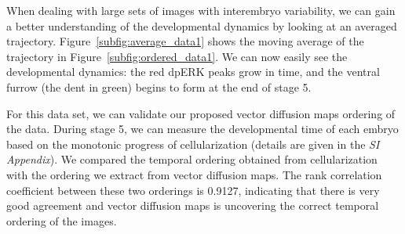 \documentclass{pnastwo}
\begin{document}
\begin{article}
When dealing with large sets of images with interembryo variability, we can gain a better understanding of the developmental dynamics by looking at an averaged trajectory.
%
Figure~\ref{subfig:average_data1} shows the moving average of the trajectory in Figure~\ref{subfig:ordered_data1}. 
%
We can now easily see the developmental dynamics: the red dpERK peaks grow in time, and the ventral furrow (the dent in green) begins to form at the end of stage 5. 

For this data set, we can validate our proposed vector diffusion maps ordering of the data.
%
During stage 5, we can measure the developmental time of each embryo based on the monotonic progress of cellularization (details are given in the {\it SI Appendix}).
%
We compared the temporal ordering obtained from cellularization with the ordering we extract from vector diffusion maps. 
%
The rank correlation coefficient between these two orderings is 0.9127, indicating that there is very good agreement and vector diffusion maps is uncovering the correct temporal ordering of the images. 


\end{article}
\end{document}
